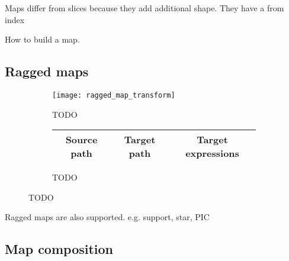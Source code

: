 \documentclass[thesis]{subfiles}
\begin{document}
Maps differ from slices because they add additional shape. They have a from index

How to build a map.



\subsection{Ragged maps}

\begin{figure}[h]
  \centering
  \begin{subfigure}{\textwidth}
    \centering
    \texttt{[image: ragged\_map\_transform]}
    \caption{
      TODO
    }
    \label{fig:ragged_map_transform_flowchart}
  \end{subfigure}

  \vspace{1em}

  \begin{subfigure}{\textwidth}
    \centering
    \begin{tabular}{|c|c|c|}
      \hline
      \textbf{Source path} & \textbf{Target path} & \textbf{Target expressions} \\
      \hline
      \hline
    \end{tabular}
    \caption{
      TODO
    }
    \label{fig:ragged_map_transform_exprs}
  \end{subfigure}

  \caption{
    TODO
  }
  \label{fig:ragged_map_transform}
\end{figure}

Ragged maps are also supported. e.g. support, star, PIC


\subsection{Map composition}
\end{document}
